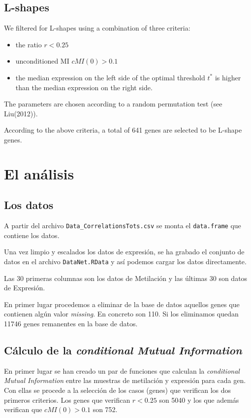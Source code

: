 \documentclass[a4paper,10pt]{article}
\begin{document}
\subsection{L-shapes}

We filtered for L-shapes using a combination of three criteria:
\begin{itemize}
\item the ratio $r<0.25$
\item unconditioned MI $\mathit{cMI}(0)>0.1$
\item the median expression on the left side of the optimal threshold $t^{\ast}$ is higher
than the median expression on the right side.
\end{itemize}

The parameters are chosen according to a random permutation test (see Liu(2012)).

\medskip
According to the above criteria, a total of 641 genes are selected to be L-shape genes.

\section{El análisis}

\subsection{Los datos}

A partir del archivo \verb|Data_CorrelationsTots.csv| se monta el \verb|data.frame| que contiene los datos.

Una vez limpio y escalados los datos de expresión, se ha grabado el conjunto de datos en el archivo \verb|DataNet.RData| y así podemos cargar los datos directamente.

Las 30 primeras columnas son los datos de Metilación y las últimas 30 son datos de Expresión.

\medskip
En primer lugar procedemos a eliminar de la base de datos aquellos genes que contienen algún valor \textit{missing}. En concreto son 110.
Si los eliminamos quedan 11746 genes remanentes en la base de datos.

\subsection{Cálculo de la \textit{conditional Mutual Information}}

En primer lugar se han creado un par de funciones que calculan la \textit{conditional Mutual Information} entre las muestras de metilación y expresión para cada gen.
Con ellas se procede a la selección de los casos (genes) que verifican los dos primeros criterios.
Los genes que verifican $r<0.25$ son 5040 y los que además verifican que $cMI(0)>0.1$ son 752.
\end{document}
